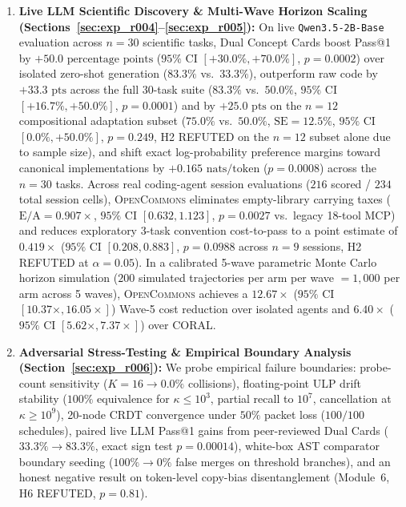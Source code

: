 \documentclass[10pt,twocolumn]{article}
\begin{document}
\begin{enumerate}
    \item \textbf{Live LLM Scientific Discovery \& Multi-Wave Horizon Scaling (Sections~\ref{sec:exp_r004}--\ref{sec:exp_r005}):} On live \texttt{Qwen3.5-2B-Base} evaluation across $n=30$ scientific tasks, Dual Concept Cards boost Pass@1 by $+50.0\text{ percentage points}$ ($95\%$ CI $[+30.0\%, +70.0\%]$, $p = 0.0002$) over isolated zero-shot generation ($83.3\%$ vs.\ $33.3\%$), outperform raw code by $+33.3\text{ pts}$ across the full 30-task suite ($83.3\%$ vs.\ $50.0\%$, $95\%$ CI $[+16.7\%, +50.0\%]$, $p = 0.0001$) and by $+25.0\text{ pts}$ on the $n=12$ compositional adaptation subset ($75.0\%$ vs.\ $50.0\%$, $\text{SE} = 12.5\%$, $95\%$ CI $[0.0\%, +50.0\%]$, $p = 0.249$, H2 REFUTED on the $n=12$ subset alone due to sample size), and shift exact log-probability preference margins toward canonical implementations by $+0.165\text{ nats/token}$ ($p = 0.0008$) across the $n=30$ tasks. Across real coding-agent session evaluations ($216$ scored / $234$ total session cells), \textsc{OpenCommons} eliminates empty-library carrying taxes ($\text{E/A} = 0.907\times$, $95\%$ CI $[0.632, 1.123]$, $p = 0.0027$ vs.\ legacy 18-tool MCP) and reduces exploratory 3-task convention cost-to-pass to a point estimate of $0.419\times$ ($95\%$ CI $[0.208, 0.883]$, $p = 0.0988$ across $n=9$ sessions, H2 REFUTED at $\alpha = 0.05$). In a calibrated 5-wave parametric Monte Carlo horizon simulation ($200$ simulated trajectories per arm per wave $= 1{,}000$ per arm across 5 waves), \textsc{OpenCommons} achieves a $12.67\times$ ($95\%$ CI $[10.37\times, 16.05\times]$) Wave-5 cost reduction over isolated agents and $6.40\times$ ($95\%$ CI $[5.62\times, 7.37\times]$) over \textsc{CORAL}.
    \item \textbf{Adversarial Stress-Testing \& Empirical Boundary Analysis (Section~\ref{sec:exp_r006}):} We probe empirical failure boundaries: probe-count sensitivity ($K=16 \to 0.0\%$ collisions), floating-point ULP drift stability ($100\%$ equivalence for $\kappa \le 10^3$, partial recall to $10^7$, cancellation at $\kappa \ge 10^9$), 20-node CRDT convergence under $50\%$ packet loss ($100/100$ schedules), paired live LLM Pass@1 gains from peer-reviewed Dual Cards ($33.3\% \to 83.3\%$, exact sign test $p = 0.00014$), white-box AST comparator boundary seeding ($100\% \to 0\%$ false merges on threshold branches), and an honest negative result on token-level copy-bias disentanglement (Module~6, H6 REFUTED, $p = 0.81$).
\end{enumerate}

\end{document}
